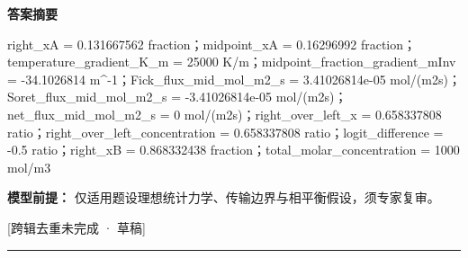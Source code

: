 \documentclass[UTF8,11pt,a4paper]{ctexart}
\begin{document}
\noindent\textbf{答案摘要}\par
right\_xA = 0.131667562 fraction；midpoint\_xA = 0.16296992 fraction；temperature\_gradient\_K\_m = 25000 K/m；midpoint\_fraction\_gradient\_mInv = -34.1026814 m\textasciicircum{}-1；Fick\_flux\_mid\_mol\_m2\_s = 3.41026814e-05 mol/(m2s)；Soret\_flux\_mid\_mol\_m2\_s = -3.41026814e-05 mol/(m2s)；net\_flux\_mid\_mol\_m2\_s = 0 mol/(m2s)；right\_over\_left\_x = 0.658337808 ratio；right\_over\_left\_concentration = 0.658337808 ratio；logit\_difference = -0.5 ratio；right\_xB = 0.868332438 fraction；total\_molar\_concentration = 1000 mol/m3\par
\noindent\textbf{模型前提：}
仅适用题设理想统计力学、传输边界与相平衡假设，须专家复审。\par
\noindent\textcolor{red!65!black}{[跨辑去重未完成 · 草稿]} \par
\medskip\hrule\medskip
{}
\end{document}
